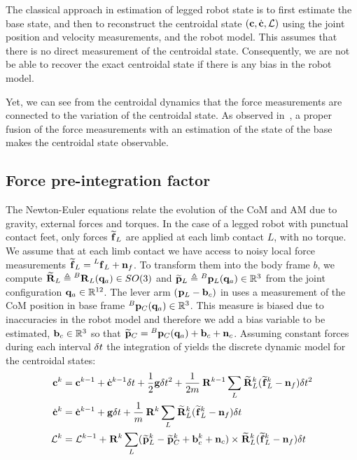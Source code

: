 The classical approach in estimation of legged robot state is to first estimate the base state, and then to reconstruct the centroidal state $({\bf c},\dot{{\bf c}},\mathcal{L})$ using the joint position and velocity measurements, and the robot model.
This assumes that there is no direct measurement of the centroidal state.
Consequently, we are not be able to recover the exact centroidal state if there is any bias in the robot model.

Yet, we can see from the centroidal dynamics that the force measurements are connected to the variation of the centroidal state.
As observed in~\cite{carpentier2016center}, a proper fusion of the force measurements with an estimation of the state of the base makes the centroidal state observable.


\subsection{Force pre-integration factor}

The Newton-Euler equations  relate the evolution of the CoM and AM due to gravity, external forces and torques. 
In the case of a legged robot with punctual contact feet, only forces $\prescript{}{}{\widetilde{{\bf f}}}_{L}$ are applied at each limb contact $L$, with no torque. 
We assume that at each  limb contact we have access to noisy local force measurements $\prescript{}{}{\widetilde{{\bf f}}}_{L} = \prescript{L}{}{{\bf f}}_{L} + {\bf n}_f$. 
To transform them into the body frame $b$, we compute $\prescript{}{}{\widetilde{{\bf R}}}_{L} \triangleq \prescript{B}{}{{\bf R}}_{L}({\bf q}_a)  \in SO(3)$ and $\prescript{}{}{\widetilde{{\bf p}}}_{L} \triangleq \prescript{B}{}{{\bf p}}_{L}({\bf q}_a) \in \mathbb{R}^3 $ from the joint configuration ${\bf q}_a  \in \mathbb{R}^{12}$. 
The lever arm $(\prescript{}{}{{\bf p}}_{L}-{\bf b}_c)$ in  uses a measurement of the CoM position in base frame $ \prescript{B}{}{{\bf p}}_{C}({\bf q}_a) \in \mathbb{R}^3$. 
This measure is biased due to inaccuracies in the robot model and therefore we add a bias variable to be estimated, ${\bf b}_c \in \mathbb{R}^3$ so that $\prescript{}{}{\widetilde{{\bf p}}}_{C} = \prescript{B}{}{{\bf p}}_{C}({\bf q}_a) + {\bf b}_c + {\bf n}_c$.
Assuming constant forces during each interval $\delta t$ 
the integration of  yields the discrete dynamic model for the centroidal states:
%
\begin{equation}
    \begin{split}
        {\bf c}^{k} &= {\bf c}^{k-1} + \dot{{\bf c}}^{k-1} \delta t+\frac{1}{2} {\bf g} \delta t^2 + \frac{1}{2m} \prescript{}{}{{\bf R}}_{}^{k-1} \sum_L \prescript{}{}{\widetilde{{\bf R}}}_{L}^k (\prescript{}{}{\widetilde{{\bf f}}}_{L}^k - {\bf n}_{f}) \delta t^2
        \\
        \dot{{\bf c}}^{k}&= \dot{{\bf c}}^{k-1} + {\bf g} \delta t + \frac{1}{m} \prescript{}{}{{\bf R}}_{}^k \sum_L\prescript{}{}{\widetilde{{\bf R}}}_{L}^k (\prescript{}{}{\widetilde{{\bf f}}}_{L}^k - {\bf n}_{f}) \delta t 
        \\
        \mathcal{L}^{k} &= \mathcal{L}^{k-1} +\prescript{}{}{{\bf R}}_{}^k \sum_L (\prescript{}{}{\widetilde{{\bf p}}}_{L}^k  - \prescript{}{}{\widetilde{{\bf p}}}_{C}^k +  {\bf b}_{c}^k + {\bf n}_{c}) \times \prescript{}{}{\widetilde{{\bf R}}}_{L}^k(\prescript{}{}{\widetilde{{\bf f}}}_{L}^k - {\bf n}_{f}) \delta t
    \end{split}
    \label{eq:COMDiscrete}
\end{equation}


